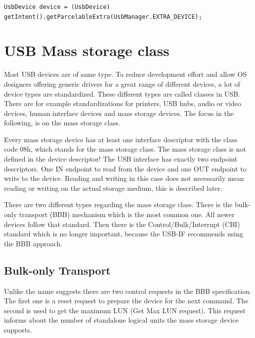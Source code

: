 \lstset{language=Java}
\begin{lstlisting}[caption={Accessing the UsbDevice in the Activity, compare to: \cite{android_usb_host}}, label=listing:access_usb_dev_activity]
UsbDevice device = (UsbDevice) getIntent().getParcelableExtra(UsbManager.EXTRA_DEVICE);
\end{lstlisting}

\chapter{USB Mass storage class}

Most USB devices are of same type. To reduce development effort and allow OS designers offering generic drivers for a great range of different devices, a lot of device types are standardized. These different types are called classes in USB. There are for example standardizations for printers, USB hubs, audio or video devices, human interface devices and mass storage devices\cite{usb_classes}. The focus in the following, is on the mass storage class.

Every mass storage device has at least one interface descriptor with the class code 08h, which stands for the mass storage class. The mass storage class is not defined in the device descriptor! The USB interface has exactly two endpoint descriptors. One IN endpoint to read from the device and one OUT endpoint to write to the device\cite{usb_ms_jan}. Reading and writing in this case does not necessarily mean reading or writing on the actual storage medium, this is described later.

There are two different types regarding the mass storage class. There is the bulk-only transport (BBB) mechanism which is the most common one. All newer devices follow that standard. Then there is the Control/Bulk/Interrupt (CBI) standard which is no longer important, because the USB-IF recommends using the BBB approach\cite{usb_ms_jan}.

\section{Bulk-only Transport}

Unlike the name suggests there are two control requests in the BBB specification. The first one is a reset request to prepare the device for the next command. The second is used to get the maximum LUN (Get Max LUN request). This request informs about the number of standalone logical units the mass storage device supports\cite{usb_ms_jan}.

